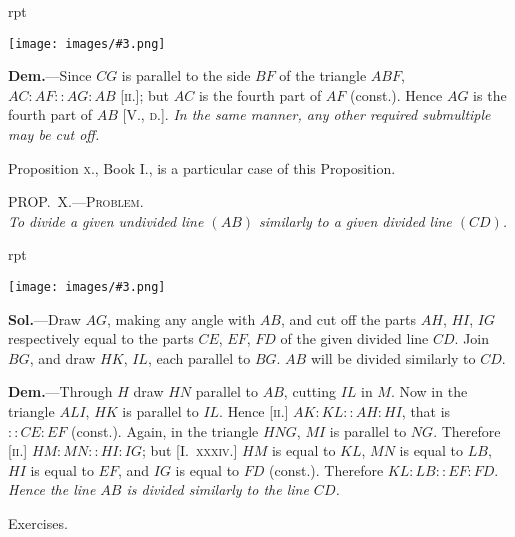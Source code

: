 \documentclass[oneside]{book}
\newcounter{wrapwidth}
\newcommand\myprop[2]{
\bigskip\Needspace*{4\baselineskip}\begin{center}\textsc{#1}\\\medskip\emph{#2}\par\end{center}
}
\newcommand\exhead[1]{
\Needspace*{5\baselineskip}\begin{center}
\textsf{#1}
\end{center}
}
\newcommand\imgflow[3]{
\setcounter{wrapwidth}{#1}
\begin{wrapfigure}[#2]{r}{\value{wrapwidth}pt}
\begin{center}
\vspace{-0.3in}
\texttt{[image: images/\#3.png]}
\end{center}
\end{wrapfigure}
}
\begin{document}

\imgflow{115}{6}{f177}

\textbf{Dem.}---Since $CG$ is parallel to the side $BF$ of the
triangle $ABF$, $AC : AF :: AG
: AB$ [\textsc{ii.}]; but $AC$ is the fourth
part of $AF$ (const.). Hence $AG$
is the fourth part of $AB$ [V., \textsc{d.}].
\textit{In the same manner, any other required
submultiple may be cut off.}

Proposition \textsc{x.}, Book I., is a particular case of this
Proposition.

\myprop{PROP\@.~X.---Problem.}{To divide a given undivided line $(AB)$ similarly to a given
divided line $(CD)$.}

\imgflow{140}{8}{f178}

\textbf{Sol.}---Draw $AG$, making any angle with $AB$, and
cut off the parts $AH$, $HI$, $IG$
respectively equal to the
parts $CE$, $EF$, $FD$ of the
given divided line $CD$. Join
$BG$, and draw $HK$, $IL$, each
parallel to $BG$. $AB$ will be
divided similarly to $CD$.

\textbf{Dem.}---Through $H$ draw
$HN$ parallel to $AB$, cutting $IL$ in $M$. Now in the
triangle $ALI$, $HK$ is parallel to $IL$. Hence [\textsc{ii.}]
$AK : KL :: AH : HI$, that is $:: CE : EF$ (const.).
Again, in the triangle $HNG$, $MI$ is parallel to $NG$.
Therefore [\textsc{ii.}] $HM : MN :: HI : IG$; but [I.~\textsc{xxxiv.}]
$HM$ is equal to $KL$, $MN$ is equal to $LB$, $HI$ is equal
to $EF$, and $IG$ is equal to $FD$ (const.). Therefore
$KL : LB :: EF : FD$. \textit{Hence the line $AB$ is divided
similarly to the line $CD$.}

\exhead{Exercises.}
\end{document}
